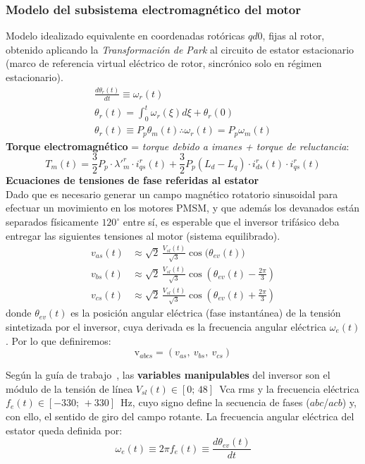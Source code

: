 \documentclass[12pt, a4paper,journal, onecolumn, compsoc]{IEEEtran}
\begin{document}
    \subsubsection{Modelo del subsistema electromagnético del motor}
    Modelo idealizado equivalente en coordenadas rotóricas \(qd0\), fijas al rotor, obtenido aplicando la \textit{Transformación de Park} al circuito de estator estacionario (marco de referencia virtual eléctrico de rotor, sincrónico solo en régimen estacionario).
    \begin{gather}
        \frac{d\theta_r(t)}{dt} \equiv \omega_r(t) \\
        \theta_r(t)=\int_0^t{\omega_r(\xi)d\xi+\theta_r(0)} \\
        \theta_r(t) \equiv P_p\theta_m(t) \therefore \omega_r(t) = P_p\omega_m(t)
    \end{gather}
    \textbf{Torque electromagnético} = \textit{torque debido a imanes + torque de reluctancia}:
    \begin{equation}
            T_m(t) = \frac{3}{2} P_p \cdot \lambda'^r_m \cdot i^r_{qs}(t) + \frac{3}{2} P_p (L_d-L_q)\cdot i^r_{ds}(t)\cdot i^r_{qs}(t)
            \label{eq:torque_electromagnetico}
    \end{equation}
\textbf{Ecuaciones de tensiones de fase referidas al estator}\\
Dado que es necesario generar un campo magnético rotatorio sinusoidal para efectuar un movimiento en los motores PMSM, y que además los devanados están separados físicamente \(120^\circ\) entre sí, es esperable que el inversor trifásico deba entregar las siguientes tensiones al motor (sistema equilibrado).
\begin{align}
v_{as}(t) &\approx \sqrt{2}\,\frac{V_{sl}(t)}{\sqrt{3}} \cos\big(\theta_{ev}(t)\big) \\
v_{bs}(t) &\approx \sqrt{2}\,\frac{V_{sl}(t)}{\sqrt{3}} \cos\left(\theta_{ev}(t) - \frac{2\pi}{3}\right) \\
v_{cs}(t) &\approx \sqrt{2}\,\frac{V_{sl}(t)}{\sqrt{3}} \cos\left(\theta_{ev}(t) + \frac{2\pi}{3}\right)
\end{align}
donde $\theta_{ev}(t)$ es la posición angular eléctrica (fase instantánea) de la tensión sintetizada por el inversor, cuya derivada es la frecuencia angular eléctrica $\omega_e(t)$. Por lo que definiremos:
\[\bm{\mathrm{v}}_{abcs} = (v_{as},\ v_{bs},\ v_{cs})\]

Según la guía de trabajo~\cite{guia_trabajo}, las \textbf{variables manipulables} del inversor son el módulo de la tensión de línea $V_{sl}(t) \in [0;\,48]$~Vca rms y la frecuencia eléctrica $f_e(t) \in [-330;\,+330]$~Hz, cuyo signo define la secuencia de fases ($abc$/$acb$) y, con ello, el sentido de giro del campo rotante. La frecuencia angular eléctrica del estator queda definida por:
\begin{equation}
    \omega_e(t) \equiv 2\pi f_e(t) \equiv \frac{d\theta_{ev}(t)}{dt}
\end{equation}
\end{document}
